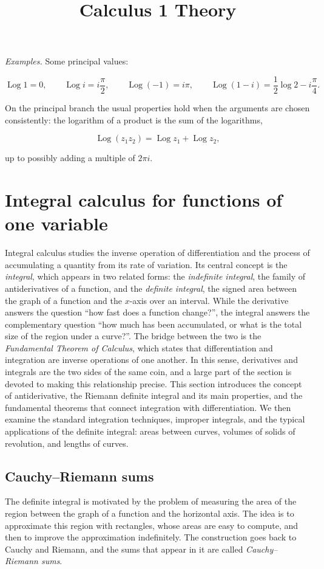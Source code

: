 \documentclass[11pt,a4paper]{article} \usepackage[T1]{fontenc}
\theoremstyle{plain} \newtheorem{theorem}{Theorem} \title{Calculus 1 Theory}
\begin{document}
\emph{Examples.} Some principal values:

\[
\operatorname{Log} 1 = 0, \qquad \operatorname{Log} i = i\frac{\pi}{2}, \qquad \operatorname{Log}(-1) = i\pi, \qquad \operatorname{Log}(1-i) = \frac12\log 2 - i\frac{\pi}{4}.
\]

On the principal branch the usual properties hold when the arguments are chosen
consistently: the logarithm of a product is the sum of the logarithms,

\[
\operatorname{Log}(z_1 z_2) = \operatorname{Log} z_1 + \operatorname{Log} z_2,
\]

up to possibly adding a multiple of $2\pi i$.

\section{Integral calculus for functions of one variable}

Integral calculus studies the inverse operation of differentiation and the
process of accumulating a quantity from its rate of variation. Its central
concept is the \emph{integral}, which appears in two related forms: the
\emph{indefinite integral}, the family of antiderivatives of a function, and
the \emph{definite integral}, the signed area between the graph of a function
and the $x$-axis over an interval. While the derivative answers the question
``how fast does a function change?'', the integral answers the complementary
question ``how much has been accumulated, or what is the total size of the
region under a curve?''. The bridge between the two is the \emph{Fundamental
Theorem of Calculus}, which states that differentiation and integration are
inverse operations of one another. In this sense, derivatives and integrals are
the two sides of the same coin, and a large part of the section is devoted to
making this relationship precise. This section introduces the concept of
antiderivative, the Riemann definite integral and its main properties, and the
fundamental theorems that connect integration with differentiation. We then
examine the standard integration techniques, improper integrals, and the
typical applications of the definite integral: areas between curves, volumes of
solids of revolution, and lengths of curves.

\subsection {Cauchy--Riemann sums}

The definite integral is motivated by the problem of measuring the area of the
region between the graph of a function and the horizontal axis. The idea is to
approximate this region with rectangles, whose areas are easy to compute, and
then to improve the approximation indefinitely. The construction goes back to
Cauchy and Riemann, and the sums that appear in it are called
\emph{Cauchy--Riemann sums}.
\end{document}
